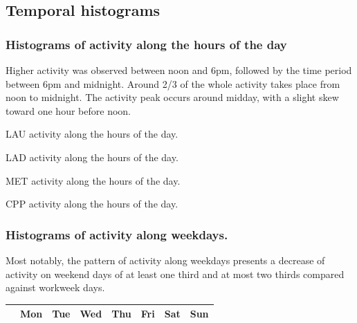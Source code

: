 \documentclass[%
 aip,
 jmp,%
 amsmath,amssymb,
 reprint,%
 floatfix,
]{revtex4-1}
\begin{document}
\FloatBarrier
\subsection{Temporal histograms}
\subsubsection{Histograms of activity along the hours of the day}\label{si:hours}

Higher activity was observed between noon and 6pm, followed by the time period between 6pm and midnight.
Around 2/3 of the whole activity takes place from noon to midnight.
The activity peak occurs around midday, with a slight skew toward one hour before noon.
\begin{table}[!h]
	\caption{LAU activity along the hours of the day.}
	\footnotesize
	
\end{table}

\begin{table}[!h]
	\caption{LAD activity along the hours of the day.}
	\footnotesize
	
\end{table}

\begin{table}[!h]
	\caption{MET activity along the hours of the day.}
	\footnotesize
	
\end{table}

\begin{table}[!h]
	\caption{CPP activity along the hours of the day.}
	\footnotesize
	
\end{table}

\FloatBarrier

\subsubsection{Histograms of activity along weekdays.}
Most notably, the pattern of activity along weekdays presents
a decrease of activity on weekend days of at least one third and at most two thirds
compared against workweek days.

\begin{table}[!h]
\begin{center}
    \begin{tabular}{ | l ||  c | c | c | c | c |   c | c |}
        \hline
        & Mon & Tue & Wed & Thu & Fri & Sat & Sun  \\ \hline
	
    \end{tabular}
\end{center}
\label{tab:win}
\end{table}
\end{document}
